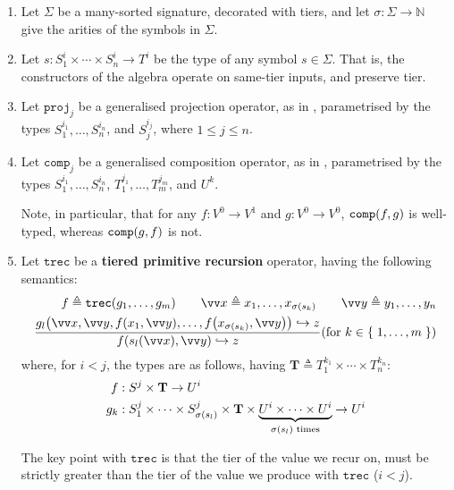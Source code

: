 \begin{definition} \cite{dal-lago-et-al-2010}

\begin{enumerate}[label=(\arabic*)]

\item Let $\Sigma$ be a many-sorted signature, decorated with tiers, and let
$\sigma : \Sigma \rightarrow \mathbb{N}$ give the arities of the symbols in
$\Sigma$.


\item Let $s : S_1^i \times \cdots \times S_n^i \rightarrow T^i$ be the type of
any symbol $s \in \Sigma$. That is, the constructors of the algebra operate on
same-tier inputs, and preserve tier.

\item Let $\mathtt{proj}_j$ be a generalised projection operator, as in
,  parametrised by the types $S_1^{i_1}, \ldots,
S_n^{i_n}$, and $S_j^{i_j}$, where $1 \leq j \leq n$.

\item Let $\mathtt{comp}_j$ be a generalised composition operator, as in
, parametrised by the types $S_1^{i_1}, \ldots,
S_n^{i_n}$, $T_1^{j_1}, \ldots, T_m^{j_m}$, and $U^k$.

Note, in particular, that for any $f : V^0 \rightarrow V^1$ and $g : V^0
\rightarrow V^0$, $\mathtt{comp}{\mathopen{}\left({f,g}\right)\mathclose{}}$ is well-typed, whereas
$\mathtt{comp}{\mathopen{}\left({g,f}\right)\mathclose{}}$ is not.

\item Let $\mathtt{trec}$ be a \textbf{tiered primitive recursion} operator,
having the following semantics: \begin{align*}
%
f \triangleq \mathtt{trec}\p{g_1,\ldots,g_m} \quad\quad
%
\vect{x} \triangleq x_1, \ldots, x_{\sigma\p{s_k}} \quad\quad
%
\vect{y} \triangleq y_1, \ldots, y_n \\
%
\judgement{
%
  g_l\p{\vect{x}, \vect{y}, f\p{x_1, \vect{y}}, \ldots, f\p{x_{\sigma\p{s_k}},
\vect{y}}} \goesto z
%
}{
%
  f\p{s_l\p{\vect{x}},\vect{y}} \goesto z
%
}\p{\text{for $k \in \set{1,\ldots,m}$}}
%
\end{align*} where, for $i<j$, the types are as follows, having $\mathbf{T}
\triangleq T_1^{k_1} \times \cdots \times T_n^{k_n}$:\begin{align*}
%
f &: S^j \times \mathbf{T} \rightarrow U^i \\
%
g_k &:  S_1^j \times \cdots \times S_{\sigma\p{s_l}}^j \times \mathbf{T} \times
\underbrace{U^i \times \cdots \times U^i}_{\text{$\sigma\p{s_l}$ times}}
\rightarrow U^i
%
\end{align*}

The key point with $\mathtt{trec}$ is that the tier of the value we recur on,
must be strictly greater than the tier of the value we produce with
$\mathtt{trec}$ ($i < j$).

\end{enumerate}

\end{definition}


